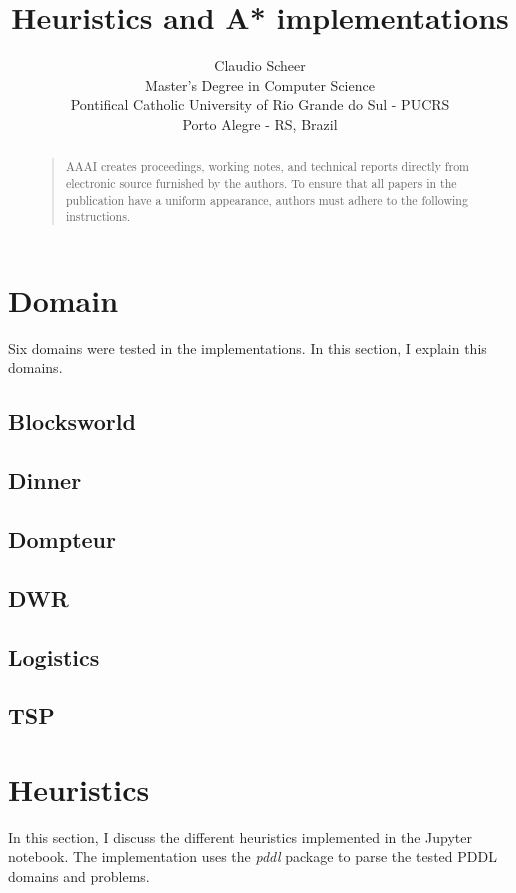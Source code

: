 \documentclass[letterpaper]{article}
\begin{document}
\title{Heuristics and A* implementations}
\author{Claudio Scheer\\
  Master's Degree in Computer Science\\
  Pontifical Catholic University of Rio Grande do Sul - PUCRS\\
  Porto Alegre - RS, Brazil\\
}
\maketitle
\begin{abstract}
  \begin{quote}
    AAAI creates proceedings, working notes, and technical reports directly from electronic source furnished by the authors. To ensure that all papers in the publication have a uniform appearance, authors must adhere to the following instructions.
  \end{quote}
\end{abstract}


\section{Domain}
Six domains were tested in the implementations. In this section, I explain this domains.

\subsection{Blocksworld}
\subsection{Dinner}
\subsection{Dompteur}
\subsection{DWR}
\subsection{Logistics}
\subsection{TSP}


\section{Heuristics}
In this section, I discuss the different heuristics implemented in the Jupyter notebook. The implementation uses the \textit{pddl} package to parse the tested PDDL domains and problems.
\end{document}
